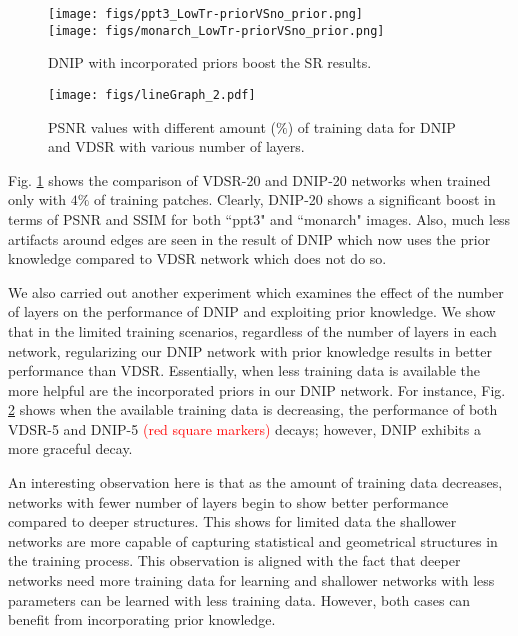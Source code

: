 \documentclass[9pt]{article}
\def\tcr{\textcolor{red}}
\begin{document}
\begin{figure}[t!]
  \centering
  \texttt{[image: figs/ppt3\_LowTr-priorVSno\_prior.png]}\\
  \texttt{[image: figs/monarch\_LowTr-priorVSno\_prior.png]}\vspace{-0.15in}
  \caption{DNIP with incorporated priors boost the SR results.}\vspace{-0.17in}
  \label{Fig:VDSR_DNIP_20_4percent}
\end{figure}%
\begin{figure}
  \centering
  \texttt{[image: figs/lineGraph\_2.pdf]}\vspace{-0.15in}
  \caption{PSNR values with different amount ($\%$) of training data for DNIP and VDSR with various number of layers.}\vspace{-0.15in}
  \label{Fig:PSNR_plot_all_layers_all_percentages}
\end{figure}



Fig. \ref{Fig:VDSR_DNIP_20_4percent} shows the comparison of VDSR-20 and DNIP-20 networks when trained only with $4\%$ of training patches. Clearly, DNIP-20 shows a significant boost in terms of PSNR and SSIM for both ``ppt3" and ``monarch" images. Also, much less artifacts around edges are seen in the result of DNIP which now uses the prior knowledge compared to VDSR network which does not do so.



We also carried out another experiment which examines the effect of the number of layers on the performance of DNIP and exploiting prior knowledge. We show that in the limited training scenarios, regardless of the number of layers in each network, regularizing our DNIP network with prior knowledge results in better performance than VDSR. Essentially, when less training data is available the more helpful are the incorporated priors in our DNIP network. For instance, Fig. \ref{Fig:PSNR_plot_all_layers_all_percentages}  shows when the available training data is decreasing, the performance of both VDSR-5 and DNIP-5 \tcr{(red square markers)} decays; however, DNIP exhibits a more graceful decay.



An interesting observation here is that as the amount of training data decreases, networks with fewer number of layers begin to show better performance compared to deeper structures. This shows for limited data the shallower networks are more capable of capturing statistical and geometrical structures in the training process. This observation is aligned with the fact that deeper networks need more training data for learning and shallower networks with less parameters can be learned with less training data. However, both cases can benefit from incorporating prior knowledge.
\end{document}
